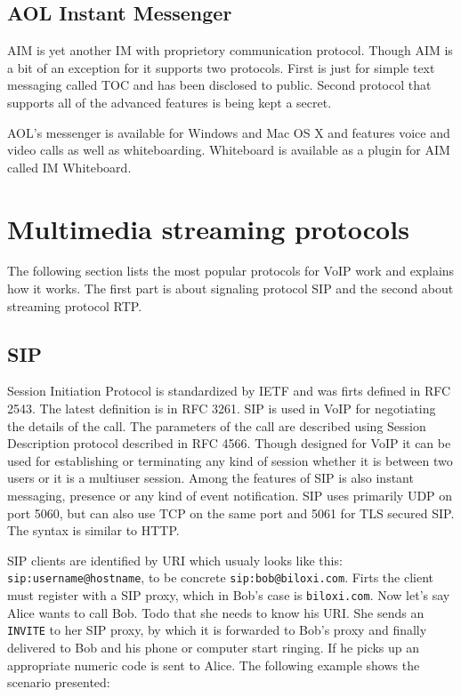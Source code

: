 \subsection*{AOL Instant Messenger}
AIM is yet another IM with proprietory communication protocol. Though AIM is a bit of an exception for it supports two protocols. First is just for simple text messaging called TOC and has been disclosed to public. Second protocol that supports all of the advanced features is being kept a secret.

AOL's messenger is available for Windows and Mac OS X and features voice and video calls as well as whiteboarding. Whiteboard is available as a plugin for AIM called IM Whiteboard. 

\section{Multimedia streaming protocols}
The following section lists the most popular protocols for VoIP work and explains how it works. The first part is about signaling protocol SIP and the second about streaming protocol RTP.

\subsection*{SIP}
Session Initiation Protocol is standardized by IETF and was firts defined in RFC 2543. The latest definition is in RFC 3261. SIP is used in VoIP for negotiating the details of the call. The parameters of the call are described using Session Description protocol described in RFC 4566. Though designed for VoIP it can be used for establishing or terminating any kind of session whether it is between two users or it is a multiuser session. Among the features of SIP is also instant messaging, presence or any kind of event notification. SIP uses primarily UDP on port 5060, but can also use TCP on the same port and 5061 for TLS secured SIP. The syntax is similar to HTTP.

SIP clients are identified by URI which usualy looks like this: \verb|sip:username@hostname|, to be concrete \verb|sip:bob@biloxi.com|. Firts the client must register with a SIP proxy, which in Bob's case is \verb|biloxi.com|. Now let's say Alice wants to call Bob. Todo that she needs to know his URI. She sends an \verb|INVITE| to her SIP proxy, by which it is forwarded to Bob's proxy and finally delivered to Bob and his phone or computer start ringing. If he picks up an appropriate numeric code is sent to Alice. The following example\cite{SIPRFC} shows the scenario presented:    

